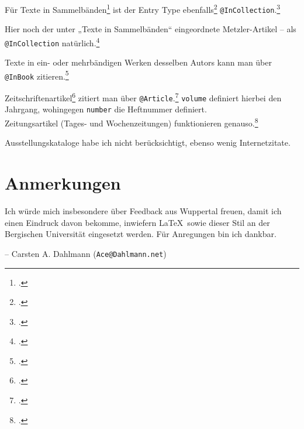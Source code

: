 \documentclass[12pt,notitlepage,parskip]{scrartcl}
\begin{document}
Für Texte in Sammelbänden\Footcite[71\psq]{unselbst-sammel} ist der Entry Type
ebenfalls\Footcite[368]{unselbst-sammel2}
\texttt{@InCollection}.\Footcite[368]{unselbst-sammel2}

Hier noch der unter „Texte in Sammelbänden“ eingeordnete Metzler-Artikel – als
\texttt{@InCollection} natürlich.\Footcite{unselbst-lexikon2}

Texte in ein- oder mehrbändigen Werken desselben Autors kann man über
\texttt{@InBook} zitieren.\Footcite[269\psqq]{unselbst-sammel-ders}

Zeitschriftenartikel\Footcite[336]{unselbst-zeitsch} zitiert man über
\texttt{@Article}.\Footcite[40]{unselbst-zeitsch2} \texttt{volume} definiert
hierbei den Jahrgang, wohingegen \texttt{number} die Heftnummer definiert.\\
Zeitungsartikel (Tages- und Wochenzeitungen) funktionieren
genauso.\Footcite{unselbst-zeitung}

Ausstellungskataloge habe ich nicht berücksichtigt, ebenso wenig Internetzitate.

\section{Anmerkungen}
Ich würde mich insbesondere über Feedback aus Wuppertal freuen, damit ich einen
Eindruck davon bekomme, inwiefern \LaTeX\ sowie dieser Stil an der Bergischen
Universität eingesetzt werden. Für Anregungen bin ich dankbar.

– Carsten A. Dahlmann (\texttt{Ace@Dahlmann.net})

\newpage
\printbibliography
\end{document}
